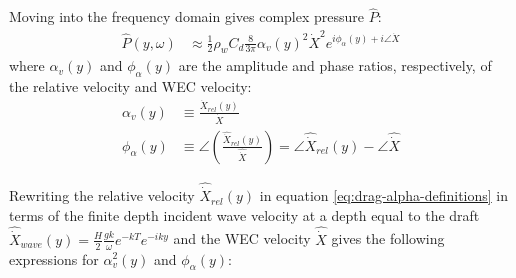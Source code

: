 Moving into the frequency domain gives complex pressure $\hat{P}$:
\begin{equation}
\begin{aligned}
 \hat{P}(y,\omega)  &\approx \frac{1}{2} \rho_w C_d \frac{8}{3\pi}\alpha_v(y)^2 \dot{X}^2 e^{i\phi_\alpha(y)+i\angle\dot{X}}
    \end{aligned}
\end{equation}
where $\alpha_v(y)$ and $\phi_\alpha(y)$ are the amplitude and phase ratios, respectively, of the relative velocity and WEC velocity:
\begin{equation}\label{eq:drag-alpha-definitions}
\begin{aligned}
    \alpha_v(y) &\equiv \frac{\dot{X}_{rel}(y)}{\dot{X}} \\
    \phi_\alpha(y) &\equiv \angle
    \left(
        \frac{\hat{\dot{X}}_{rel}(y)}
            {\hat{\dot{X}}}
    \right)   
    = \angle\hat{\dot{X}}_{rel}(y) -  \angle\hat{\dot{X}} 
\end{aligned}
\end{equation}

Rewriting the relative velocity $\hat{\dot{X}}_{rel}(y)$ in equation \eqref{eq:drag-alpha-definitions} in terms of the finite depth incident wave velocity at a depth equal to the draft $\hat{\dot{X}}_{wave}(y) = \frac{H}{2} \frac{g k}{\omega} e^{-kT} e^{-iky}$ and the WEC velocity $\hat{\dot{X}}$ gives the following expressions for $\alpha_v^2(y)$ and $\phi_\alpha(y)$:

